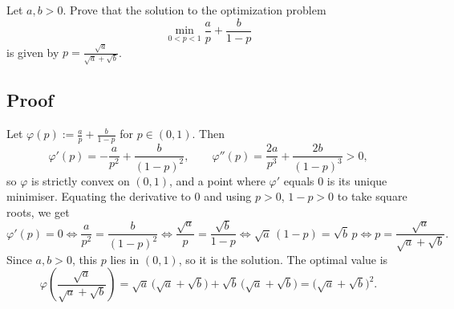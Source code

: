 \documentclass[11pt,a4paper]{article}
\begin{document}
Let $a, b > 0$. Prove that the solution to the optimization problem
\[
  \min_{0 < p < 1} \frac{a}{p} + \frac{b}{1-p}
\]
is given by $p = \frac{\sqrt{a}}{\sqrt{a} + \sqrt{b}}$.

\subsection*{Proof}
Let $\varphi(p) := \frac{a}{p} + \frac{b}{1-p}$ for $p \in (0,1)$. Then
\[
  \varphi'(p) = -\frac{a}{p^2} + \frac{b}{(1-p)^2}, \qquad
  \varphi''(p) = \frac{2a}{p^3} + \frac{2b}{(1-p)^3} > 0 ,
\]
so $\varphi$ is strictly convex on $(0,1)$, and a point where $\varphi'$ equals $0$ is its unique
minimiser. Equating the derivative to $0$ and using $p > 0$, $1-p > 0$ to take square roots, we get
\[
  \varphi'(p) = 0
  \iff \frac{a}{p^2} = \frac{b}{(1-p)^2}
  \iff \frac{\sqrt{a}}{p} = \frac{\sqrt{b}}{1-p}
  \iff \sqrt{a}\,(1-p) = \sqrt{b}\,p
  \iff p = \frac{\sqrt{a}}{\sqrt{a} + \sqrt{b}} .
\]
Since $a, b > 0$, this $p$ lies in $(0,1)$, so it is the solution. The optimal value is
\[
  \varphi\left(\frac{\sqrt{a}}{\sqrt{a} + \sqrt{b}}\right)
  = \sqrt{a}\,\bigl(\sqrt{a} + \sqrt{b}\bigr) + \sqrt{b}\,\bigl(\sqrt{a} + \sqrt{b}\bigr)
  = \bigl(\sqrt{a} + \sqrt{b}\bigr)^2 .
\]
\end{document}
